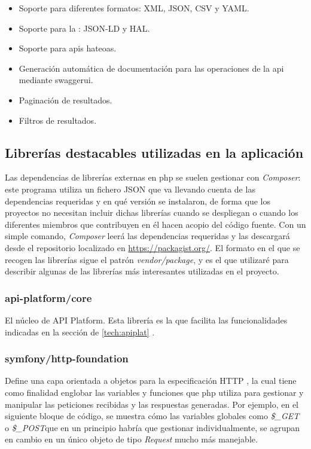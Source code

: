  \begin{itemize}
    \item Soporte para diferentes formatos: XML, JSON, CSV y YAML.
    \item Soporte para la : JSON-LD y HAL.
    \item Soporte para \gls{api}s \gls{hateoas}.
    \item Generación automática de documentación para las operaciones de la
        \gls{api} mediante \gls{swaggerui}.
    \item Paginación de resultados.
    \item Filtros de resultados.
 \end{itemize}

\subsection{Librerías destacables utilizadas en la aplicación}
Las dependencias de librerías externas en \gls{php} se suelen gestionar con
\textit{Composer}: este programa utiliza un fichero JSON que va llevando cuenta
de las dependencias requeridas y en qué versión se instalaron, de forma que los
proyectos no necesitan incluir dichas librerías cuando se despliegan o cuando
los diferentes miembros que contribuyen en él hacen acopio del código fuente.
Con un simple comando, \textit{Composer} leerá las dependencias requeridas y
las descargará desde el repositorio localizado en \url{https://packagist.org/}.
El formato en el que se recogen las librerías sigue el patrón
\textit{vendor/package}, y es el que utilizaré para describir algunas de las
librerías más interesantes utilizadas en el proyecto.

\subsubsection{api-platform/core}
El núcleo de API Platform. Esta librería es la que facilita las funcionalidades
indicadas en la sección de  \ref{tech:apiplat}
.

\subsubsection{symfony/http-foundation}
Define una capa orientada a objetos para la especificación HTTP
\cite{symfony_httpfound}, la cual tiene como finalidad englobar las variables
y funciones que \gls{php} utiliza para gestionar y manipular las peticiones
recibidas y las respuestas generadas\cite{symfony_httpfound_two}. Por ejemplo,
en el siguiente bloque de código, se muestra cómo las variables globales
\textemdash como \textit{\$\_GET} o \textit{\$\_POST}\textemdash que en un
principio habría que gestionar individualmente, se agrupan en cambio en un único
objeto de tipo \textit{Request} mucho más manejable.

